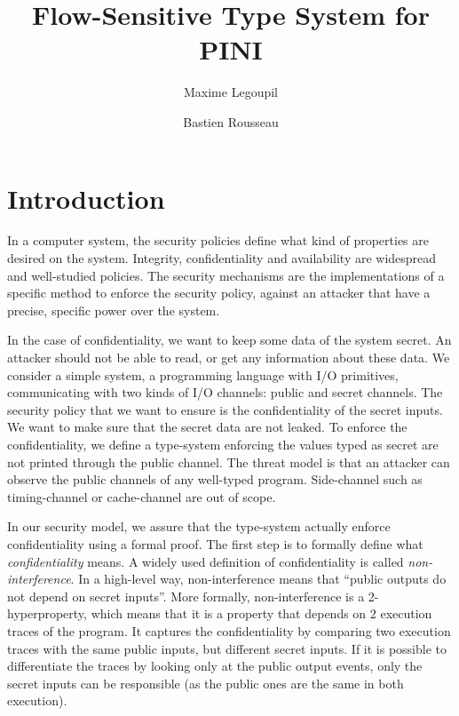 \documentclass[10pt]{article}
\title{
   Flow-Sensitive Type System for PINI
}
\author{Maxime Legoupil \and Bastien Rousseau }
\begin{document}
\maketitle


\thispagestyle{empty}

\section{Introduction}
\label{sec:intro}

In a computer system, the security policies define what kind of properties are desired on the
system. Integrity, confidentiality and availability are widespread and well-studied policies.
The security mechanisms are the implementations of a specific method to enforce the security policy,
against an attacker that have a precise, specific power over the system.

In the case of confidentiality, we want to keep some data of the system secret. An attacker should
not be able to read, or get any information about these data. We consider a simple system, a
programming language with I/O primitives, communicating with two kinds of I/O channels: public and
secret channels.
The security policy that we want to ensure is the confidentiality of the secret inputs. We
want to make sure that the secret data are not leaked. To enforce the confidentiality, we define a
type-system enforcing the values typed as secret are not printed through the public channel.
The threat model is that an attacker can observe the public channels of any well-typed program.
Side-channel such as timing-channel or cache-channel are out of scope.

In our security model, we assure that the type-system actually enforce confidentiality using a
formal proof.
The first step is to formally define what \emph{confidentiality} means. A widely used
definition of confidentiality is called \emph{non-interference}. In a high-level way,
non-interference means that ``public outputs do not depend on secret inputs''.
More formally, non-interference is a 2-hyperproperty, which means that it is a property that
depends on 2 execution traces of the program. It captures the confidentiality by comparing
two execution traces with the same public inputs, but different secret inputs. If it is possible
to differentiate the traces by looking only at the public output events, only the secret inputs can
be responsible (as the public ones are the same in both execution).
\end{document}
